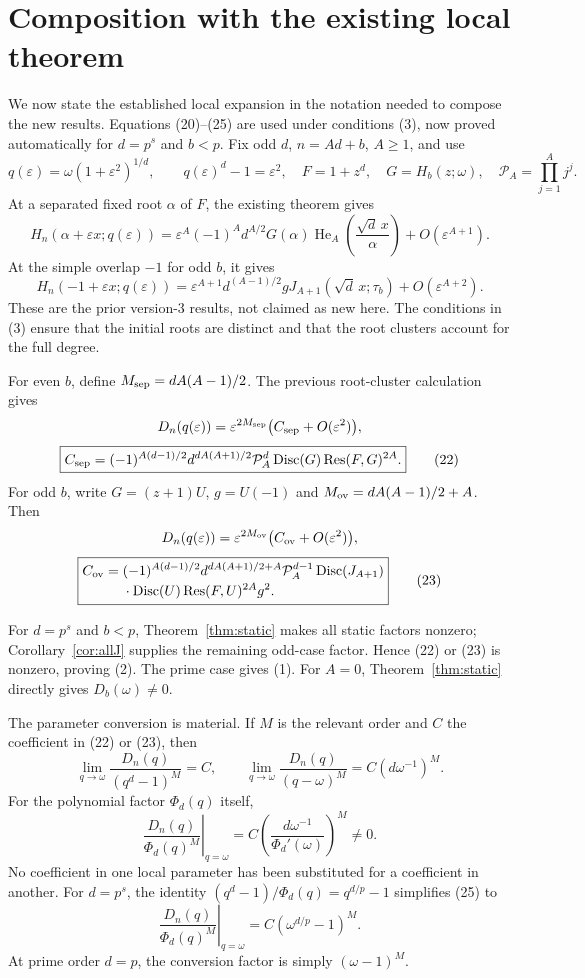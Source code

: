 \documentclass[11pt]{article}
\theoremstyle{remark}\newtheorem{remark}[theorem]{Remark}
\newcommand{\He}{\operatorname{He}}
\newcommand{\Disc}{\operatorname{Disc}}
\newcommand{\Res}{\operatorname{Res}}
\newcommand{\eps}{\varepsilon}
\begin{document}
\section{Composition with the existing local theorem}\label{sec:leading}

We now state the established local expansion in the notation needed
to compose the new results. Equations (20)--(25) are used under
conditions (3), now proved automatically for $d=p^s$ and $b<p$.
Fix odd $d$, $n=Ad+b$, $A\geq1$,
and use
\[
q(\eps)=\omega(1+\eps^2)^{1/d},\qquad q(\eps)^d-1=\eps^2,
\quad F=1+z^d,\quad G=H_b(z;\omega),\quad
\mathcal P_A=\prod_{j=1}^A j^j.
\]
At a separated fixed root $\alpha$ of $F$, the existing theorem gives
\[
H_n(\alpha+\eps x;q(\eps))
=\eps^A(-1)^A d^{A/2}G(\alpha)
 \He_A\!\left(\frac{\sqrt d\,x}{\alpha}\right)
+O(\eps^{A+1}).
\tag{20}
\]
At the simple overlap $-1$ for odd $b$, it gives
\[
H_n(-1+\eps x;q(\eps))
=\eps^{A+1}d^{(A-1)/2}g
 J_{A+1}(\sqrt d\,x;\tau_b)+O(\eps^{A+2}).
\tag{21}
\]
These are the prior version-3 results, not claimed as new here.
The conditions in (3) ensure that the initial roots are distinct
and that the root clusters account for the full degree.

For even $b$, define $M_{\rm sep}=dA(A-1)/2$. The previous
root-cluster calculation gives
\[
D_n(q(\eps))=\eps^{2M_{\rm sep}}
 \bigl(C_{\rm sep}+O(\eps^2)\bigr),
\]
\[
\boxed{
C_{\rm sep}=(-1)^{A(d-1)/2}
d^{dA(A+1)/2}\mathcal P_A^d
\Disc(G)\Res(F,G)^{2A}.}
\tag{22}
\]
For odd $b$, write $G=(z+1)U$, $g=U(-1)$ and
$M_{\rm ov}=dA(A-1)/2+A$. Then
\[
D_n(q(\eps))=\eps^{2M_{\rm ov}}
 \bigl(C_{\rm ov}+O(\eps^2)\bigr),
\]
\begin{align}
\boxed{\begin{aligned}
C_{\rm ov}={}&(-1)^{A(d-1)/2}
d^{dA(A+1)/2+A}\mathcal P_A^{d-1}
\Disc(J_{A+1})\\[-2pt]
&{}\cdot\Disc(U)\Res(F,U)^{2A}g^2.
\end{aligned}}
\tag{23}
\end{align}

For $d=p^s$ and $b<p$, Theorem~\ref{thm:static} makes all static
factors nonzero; Corollary~\ref{cor:allJ} supplies the remaining
odd-case factor. Hence (22) or (23) is nonzero, proving (2).
The prime case gives (1). For $A=0$, Theorem~\ref{thm:static}
directly gives $D_b(\omega)\ne0$.

The parameter conversion is material. If $M$ is the relevant order
and $C$ the coefficient in (22) or (23), then
\[
\lim_{q\to\omega}\frac{D_n(q)}{(q^d-1)^M}=C,
\qquad
\lim_{q\to\omega}\frac{D_n(q)}{(q-\omega)^M}
=C(d\omega^{-1})^M.
\tag{24}
\]
For the polynomial factor $\Phi_d(q)$ itself,
\[
\left.\frac{D_n(q)}{\Phi_d(q)^M}\right|_{q=\omega}
=C\left(\frac{d\omega^{-1}}{\Phi_d'(\omega)}\right)^M\ne0.
\tag{25}
\]
No coefficient in one local parameter has been substituted for a
coefficient in another.
For $d=p^s$, the identity
$(q^d-1)/\Phi_d(q)=q^{d/p}-1$ simplifies (25) to
\[
\boxed{\left.\frac{D_n(q)}{\Phi_d(q)^M}\right|_{q=\omega}
=C(\omega^{d/p}-1)^M.}
\]
At prime order $d=p$, the conversion factor is simply $(\omega-1)^M$.
\end{document}

